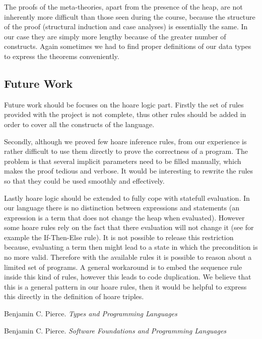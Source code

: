 \documentclass[12pt, a4paper, oneside]{article}
\begin{document}
The proofs of the meta-theories, apart from the presence of the heap, are not inherently more difficult than those seen during the course, because the structure of the proof (structural induction and case analyses) is essentially the same.
In our case they are simply more lengthy because of the greater number of constructs. Again sometimes we had to find proper definitions of our data types to express the theorems conveniently.

\subsection{Future Work}
Future work should be focuses on the hoare logic part.
Firstly the set of rules provided with the project is not complete, thus other rules should be added in order to cover all the constructs of the language.

Secondly, although we proved few hoare inference rules, from our experience is rather difficult to use them directly to prove the correctness of a program.
The problem is that several implicit parameters need to be filled manually, which makes the proof tedious and verbose.
It would be interesting to rewrite the rules so that they could be used smoothly and effectively.

Lastly hoare logic should be extended to fully cope with statefull evaluation.
In our language there is no distinction between expressions and statements 
(an expression is a term that does not change the heap when evaluated).
However some hoare rules rely on the fact that there evaluation will not change it (see for example the If-Then-Else rule). It is not possible to release this restriction because, evaluating a term then might lead to a state in which the precondition is no more valid. Therefore with the available 
rules it is possible to reason about a limited set of programs.
A general workaround is to embed the sequence rule inside this kind of rules, however this leads to code duplication. We believe that this is a general pattern in our hoare rules, then it would be helpful to express this directly in the definition of hoare triples. 


\begin{thebibliography}{1}

  Benjamin C. Pierce.
  \emph{Types and Programming Languages}

	Benjamin C. Pierce.
	\emph{Software Foundations and Programming Languages}


\end{thebibliography}
\end{document}
